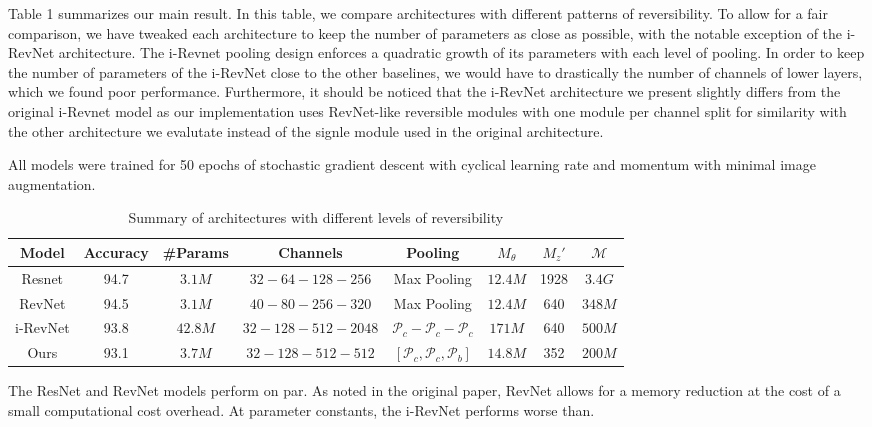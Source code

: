 \documentclass[twocolumn]{bmcart}
\begin{document}
Table 1 summarizes our main result.
In this table, we compare architectures with different patterns of reversibility.
To allow for a fair comparison, we have tweaked each architecture to keep the number of parameters as close as possible,
with the notable exception of the i-RevNet architecture. 
The i-Revnet pooling design enforces a quadratic growth of its parameters with each level of pooling.
In order to keep the number of parameters of the i-RevNet close to the other baselines, we would have to drastically 
the number of channels of lower layers, which we found poor performance. 
Furthermore, it should be noticed that the i-RevNet architecture we present slightly differs from the original i-Revnet model
as our implementation uses RevNet-like reversible modules with one module per channel split for similarity with
the other architecture we evalutate instead of the signle module used in the original architecture.

All models were trained for 50 epochs of stochastic gradient descent with cyclical learning rate and momentum \cite{smith2017super} with minimal image augmentation.

\begin{table*}[t]
\begin{tabular}{ c c c c c c c c}	
Model     & Accuracy & #Params & Channels & Pooling  & $M_{\theta}$ & $M_{z}'$ & $\mathcal{M} $ \\
\hline
Resnet    & 94.7   & $3.1M$   &  $32 - 64 - 128  - 256$       & Max Pooling      				         &  $12.4M$   &  1928  & $3.4G$  \\			
RevNet    & 94.5   & $3.1M$   &  $40 - 80 - 256  - 320$       & Max Pooling      				         &  $12.4M$   &  640   & $348M$  \\
i-RevNet  & 93.8   & $42.8M$  &  $32 - 128 - 512 - 2048$      & $\mathcal{P}_c - \mathcal{P}_c - \mathcal{P}_c$          &  $171M$    &  640   & $500M$  \\
Ours      & 93.1   & $3.7M$   &  $32 - 128 - 512 - 512$       & $[\mathcal{P}_c, \mathcal{P}_c, \mathcal{P}_b]$          &  $14.8M$   &  352   & $200M$  \\
\hline
\end{tabular}
\caption{Summary of architectures with different levels of reversibility}
\end{table*}

The ResNet and RevNet models perform on par.
As noted in the original paper, RevNet allows for a memory reduction at the cost of
a small computational cost overhead.
At parameter constants, the i-RevNet performs worse than.
\end{document}

